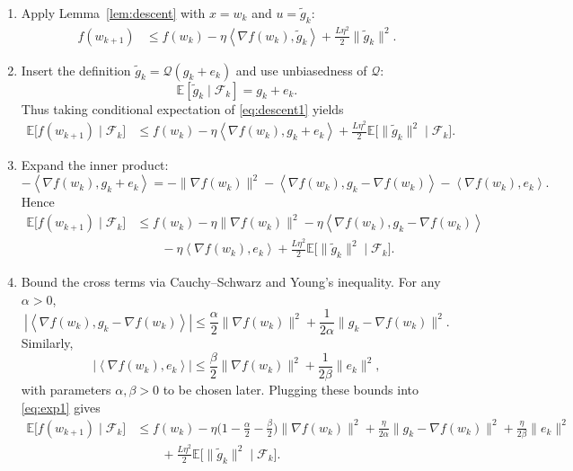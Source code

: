\documentclass{article}
\newcommand{\E}{\mathbb{E}}
\newcommand{\inner}[2]{\left\langle #1,#2\right\rangle}
\newcommand{\Q}{\mathcal{Q}}
\begin{document}
\begin{enumerate}
\item[Step 1.] Apply Lemma~\ref{lem:descent} with $x=w_k$ and $u=\tilde g_k$:
\begin{align}
    f(w_{k+1})
    &\le f(w_k)-\eta\inner{\nabla f(w_k)}{\tilde g_k}
      +\frac{L\eta^{2}}{2}\|\tilde g_k\|^{2}. \label{eq:descent1}
\end{align}
\item[Step 2.] Insert the definition $\tilde g_k=\Q(g_k+e_k)$ and use unbiasedness of $\Q$:
\[
    \E[\tilde g_k\mid\mathcal{F}_k]=g_k+e_k.
\]
Thus taking conditional expectation of \eqref{eq:descent1} yields
\begin{align}
    \E\!\big[f(w_{k+1})\mid\mathcal{F}_k\big]
    &\le f(w_k)-\eta\inner{\nabla f(w_k)}{g_k+e_k}
      +\frac{L\eta^{2}}{2}\E\!\big[\|\tilde g_k\|^{2}\mid\mathcal{F}_k\big]. \label{eq:descent2}
\end{align}
\item[Step 3.] Expand the inner product:
\[
    -\inner{\nabla f(w_k)}{g_k+e_k}
    = -\| \nabla f(w_k)\|^{2}
      -\inner{\nabla f(w_k)}{g_k-\nabla f(w_k)} 
      -\inner{\nabla f(w_k)}{e_k}.
\]
Hence
\begin{align}
    \E\!\big[f(w_{k+1})\mid\mathcal{F}_k\big]
    &\le f(w_k)-\eta\|\nabla f(w_k)\|^{2}
      -\eta\inner{\nabla f(w_k)}{g_k-\nabla f(w_k)} \nonumber\\
    &\qquad -\eta\inner{\nabla f(w_k)}{e_k}
      +\frac{L\eta^{2}}{2}\E\!\big[\|\tilde g_k\|^{2}\mid\mathcal{F}_k\big]. \label{eq:exp1}
\end{align}
\item[Step 4.] Bound the cross terms via Cauchy–Schwarz and Young’s inequality.
For any $\alpha>0$,
\[
    |\inner{\nabla f(w_k)}{g_k-\nabla f(w_k)}|
    \le \frac{\alpha}{2}\|\nabla f(w_k)\|^{2}
          +\frac{1}{2\alpha}\|g_k-\nabla f(w_k)\|^{2}.
\]
Similarly,
\[
    |\inner{\nabla f(w_k)}{e_k}|
    \le \frac{\beta}{2}\|\nabla f(w_k)\|^{2}
          +\frac{1}{2\beta}\|e_k\|^{2},
\]
with parameters $\alpha,\beta>0$ to be chosen later. Plugging these bounds into \eqref{eq:exp1} gives
\begin{align}
    \E\!\big[f(w_{k+1})\mid\mathcal{F}_k\big]
    &\le f(w_k)-\eta\Big(1-\frac{\alpha}{2}-\frac{\beta}{2}\Big)\|\nabla f(w_k)\|^{2}
      +\frac{\eta}{2\alpha}\|g_k-\nabla f(w_k)\|^{2}
      +\frac{\eta}{2\beta}\|e_k\|^{2} \nonumber\\
    &\qquad +\frac{L\eta^{2}}{2}\E\!\big[\|\tilde g_k\|^{2}\mid\mathcal{F}_k\big]. \label{eq:exp2}

\end{align}
\end{enumerate}
\end{document}
